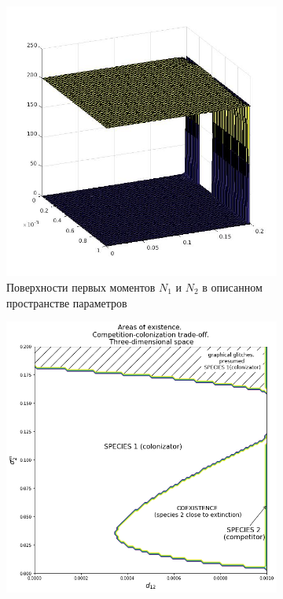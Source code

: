 \begin{figure}
	\centering
	\begin{subfigure}{.5\textwidth}
		\centering
		\includegraphics[width=.95\linewidth]{N1N2cctoD3.jpg}
		\caption{Поверхности первых моментов \(N_1\) и \(N_2\) в описанном пространстве параметров}
		\label{fig:cctod3:sub1}
	\end{subfigure}%
	\begin{subfigure}{.5\textwidth}
		\centering
		\includegraphics[width=.95\linewidth]{arccto08d3.png}

\end{subfigure}
\end{figure}
